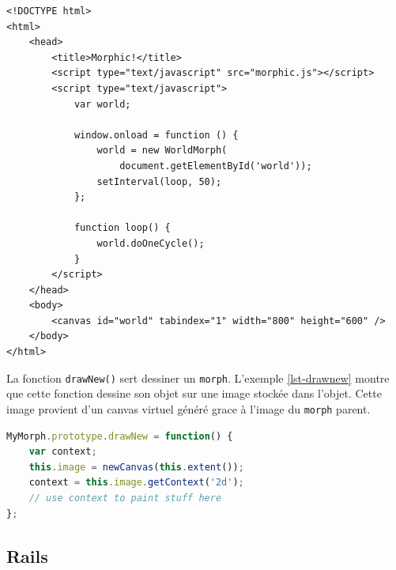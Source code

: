 \begin{lstlisting}[caption={Exemple d'utilisation de \texttt{morphic.js}},label=lst-doonecycle,language=HTML5,alsolanguage=JavaScript]
<!DOCTYPE html>
<html>
    <head>
        <title>Morphic!</title>
        <script type="text/javascript" src="morphic.js"></script>
        <script type="text/javascript">
            var world;

            window.onload = function () {
                world = new WorldMorph(
                    document.getElementById('world'));
                setInterval(loop, 50);
            };

            function loop() {
                world.doOneCycle();
            }
        </script>
    </head>
    <body>
        <canvas id="world" tabindex="1" width="800" height="600" />
    </body>
</html>
\end{lstlisting}

La fonction \texttt{drawNew()} sert dessiner un \texttt{morph}. L'exemple \ref{lst-drawnew} montre que cette fonction dessine son objet sur une image stockée dans l'objet. Cette image provient d'un canvas virtuel généré grace à l'image du \texttt{morph} parent.

\begin{lstlisting}[caption={Modèle pour la fonction \texttt{drawNew()}},label=lst-drawnew,language=JavaScript]
MyMorph.prototype.drawNew = function() {
    var context;
    this.image = newCanvas(this.extent());
    context = this.image.getContext('2d');
    // use context to paint stuff here
};
\end{lstlisting}

\subsection{Rails}
